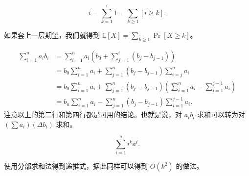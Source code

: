\begin{example}
    $$
    i=\sum_{k=1}^i 1=\sum_{k\ge 1}[i\ge k].
    $$
\end{example}
\begin{remark}
    如果套上一层期望，我们就得到 $\mathbb{E}[X]=\sum_{k\ge 1}\Pr[X\ge k]$。
\end{remark}

\begin{example}[分部求和法]
    $$
    \begin{aligned}
    \sum_{i=1}^na_ib_i&=\sum_{i=1}^na_i\left(b_0+\sum_{j=1}^i(b_j-b_{j-1})\right)\\
    &=b_0\sum_{i=1}^na_i+\sum_{j=1}^n(b_j-b_{j-1})\sum_{i=j}^n a_i\\
    &=b_0\sum_{i=1}^na_i+\sum_{j=1}^n(b_j-b_{j-1})\left(\sum_{i=1}^na_i-\sum_{i=1}^{j-1}a_i\right)\\
    &=b_n\sum_{i=1}^na_i-\sum_{j=1}^n(b_j-b_{j-1})\sum_{i=1}^{j-1}a_i.
    \end{aligned}
    $$
    注意以上的第二行和第四行都是可用的结论。也就是说，对 $a_ib_i$ 求和可以转为对 $(\sum a_i)(\Delta b_i)$ 求和。
\end{example}
    \begin{exercise}[数列求和再放送]
        $$
        \sum_{i=1}^n i^ka^i.
        $$

        使用分部求和法得到递推式，据此同样可以得到 $O(k^2)$ 的做法。
    \end{exercise}

